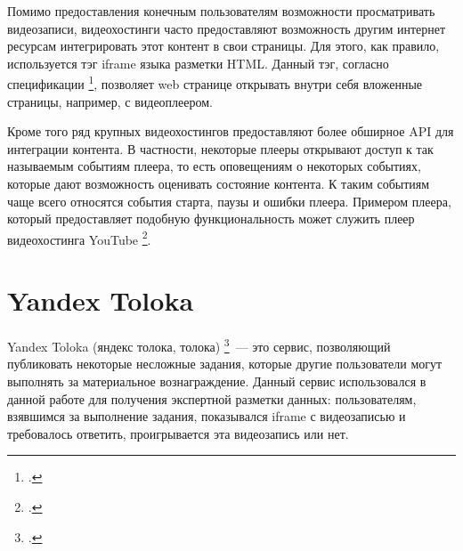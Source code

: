 Помимо предоставления конечным пользователям возможности просматривать видеозаписи, видеохостинги часто предоставляют возможность другим интернет ресурсам интегрировать этот контент в свои страницы. Для этого, как правило, используется тэг iframe языка разметки HTML. Данный тэг, согласно спецификации \footcite{HTML53}, позволяет web странице открывать внутри себя вложенные страницы, например, с видеоплеером.

Кроме того ряд крупных видеохостингов предоставляют более обширное API для интеграции контента. В частности, некоторые плееры открывают доступ к так называемым событиям плеера, то есть оповещениям о некоторых событиях, которые дают возможность оценивать состояние контента. К таким событиям чаще всего относятся события старта, паузы и ошибки плеера. Примером плеера, который предоставляет подобную функциональность может служить плеер видеохостинга YouTube \footcite{YouTubeAPI}.

\section{Yandex Toloka}

Yandex Toloka (яндекс толока, толока) \footcite{Toloka}~--- это сервис, позволяющий публиковать некоторые несложные задания, которые другие пользователи могут выполнять за материальное вознаграждение. Данный сервис использовался в данной работе для получения экспертной разметки данных: пользователям, взявшимся за выполнение задания, показывался iframe с видеозаписью и требовалось ответить, проигрывается эта видеозапись или нет.